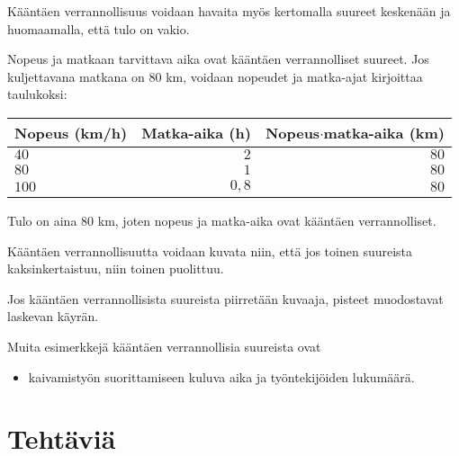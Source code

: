 
Kääntäen verrannollisuus voidaan havaita myös kertomalla suureet
keskenään ja huomaamalla, että tulo on vakio.

\begin{esimerkki}
Nopeus ja matkaan tarvittava aika ovat kääntäen verrannolliset suureet.
Jos kuljettavana matkana on $80$ km, voidaan nopeudet ja matka-ajat
kirjoittaa taulukoksi:
\begin{center} 
\begin{tabular}{|l|r|r|}
\hline
Nopeus (km/h) & Matka-aika (h) & Nopeus$\cdot$matka-aika (km) \\
\hline
$40$ & $2$ & $80$ \\
$80$ & $1$ & $80$ \\
$100$ & $0,8$ & $80$ \\
\hline
\end{tabular}
\end{center}
Tulo on aina $80$ km, joten nopeus ja matka-aika ovat kääntäen verrannolliset.
\end{esimerkki}

Kääntäen verrannollisuutta voidaan kuvata niin, että jos
toinen suureista kaksinkertaistuu, niin toinen puolittuu.

Jos kääntäen verrannollisista suureista piirretään kuvaaja, pisteet
muodostavat laskevan käyrän.


Muita esimerkkejä kääntäen verrannollisia suureista ovat
\begin{itemize}
    \item kaivamistyön suorittamiseen kuluva aika ja työntekijöiden lukumäärä.
\end{itemize}

\section*{Tehtäviä}

